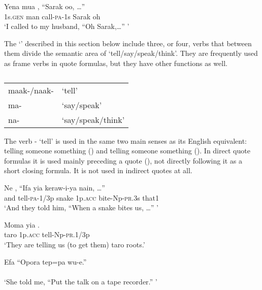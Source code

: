 \ea%
\label{ex:x311}
\gll Yena mua , ``Sarak oo, {\dots}'' \\
1s.\textsc{gen} man call-\textsc{pa}-1s Sarak oh \\
\glt`I called to my husband, ``Oh Sarak,{\dots}'' '
\z

The `' described in this section below include three, or four, verbs that between them divide the semantic area of `tell/say/speak/think'. They are frequently used as frame verbs in quote formulas, but they have other functions as well.

\begin{table}
\caption{}
\label{} 
\begin{tabular}{ll}
maak-/naak- &`tell'\\
ma- &`say/speak'\\
na- &`say/speak/think'\\
\end{tabular}

\end{table}

The verb - `tell' is used in the same two main senses as its English equivalent: telling someone  something () and telling someone  something (). In direct quote formulas it is used mainly preceding a quote (), not directly following it as a short closing formula. It is not used in indirect quotes at all.

\ea%
\label{ex:x312}
\gll Ne , ``Ifa yia keraw-i-ya nain, {\dots''} \\
and tell-\textsc{pa}-1/3p snake 1p.\textsc{acc} bite-Np-\textsc{pr}.3s that1\\
\glt`And they told him, ``When a snake bites us, {\dots}'' '
\z

\ea%
\label{ex:x313}
\gll Moma yia . \\
taro 1p.\textsc{acc} tell-Np-\textsc{pr}.1/3p \\
\glt`They are telling us (to get them) taro roots.'
\z

\ea%
\label{ex:x314}
\gll Efa\textstyleFreeTranslationChar{ } \textstyleFreeTranslationChar{, } ``Opora tep=pa wu-e.'' \\
\\
\glt`She told me, ``Put the talk on a tape recorder.'' '
\z

